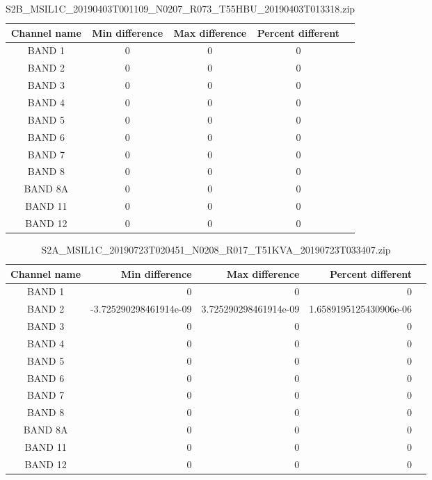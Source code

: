 \documentclass[a4paper]{article}
\begin{document}
    \begin{table}[ht!]
      \caption{\footnotesize{S2B\_MSIL1C\_20190403T001109\_N0207\_R073\_T55HBU\_20190403T013318.zip}}\label{table:18}
      \centering
      \small
      \begin{tabular}{ccccc} \midrule
        \textbf{Channel name} & \textbf{Min difference} & \textbf{Max difference} & \textbf{Percent different} \\ \midrule
        BAND 1 & 0 & 0 & 0 \\
        BAND 2 & 0 & 0 & 0 \\
        BAND 3 & 0 & 0 & 0 \\
        BAND 4 & 0 & 0 & 0 \\
        BAND 5 & 0 & 0 & 0 \\
        BAND 6 & 0 & 0 & 0 \\
        BAND 7 & 0 & 0 & 0 \\
        BAND 8 & 0 & 0 & 0 \\
        BAND 8A & 0 & 0 & 0 \\
        BAND 11 & 0 & 0 & 0 \\
        BAND 12 & 0 & 0 & 0 \\ \midrule
      \end{tabular}
    \end{table}

    \begin{table}[ht!]
      \caption{\footnotesize{S2A\_MSIL1C\_20190723T020451\_N0208\_R017\_T51KVA\_20190723T033407.zip}}\label{table:19}
      \centering
      \small
      \begin{tabular}{cn{2}{4}n{2}{4}n{2}{4}n{2}{4}} \midrule
        \textbf{Channel name} & \textbf{Min difference} & \textbf{Max difference} & \textbf{Percent different} \\ \midrule
        BAND 1 & 0 & 0 & 0 \\
        BAND 2 & -3.725290298461914e-09 & 3.725290298461914e-09 & 1.6589195125430906e-06 \\
        BAND 3 & 0 & 0 & 0 \\
        BAND 4 & 0 & 0 & 0 \\
        BAND 5 & 0 & 0 & 0 \\
        BAND 6 & 0 & 0 & 0 \\
        BAND 7 & 0 & 0 & 0 \\
        BAND 8 & 0 & 0 & 0 \\
        BAND 8A & 0 & 0 & 0 \\
        BAND 11 & 0 & 0 & 0 \\
        BAND 12 & 0 & 0 & 0 \\ \midrule
      \end{tabular}
    \end{table}
\end{document}
